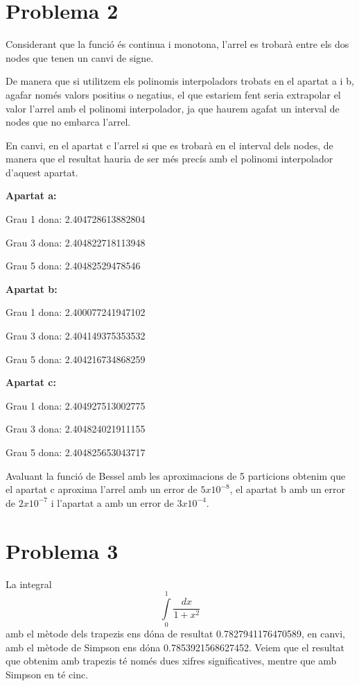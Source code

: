 \documentclass{article}
\begin{document}
	\section{Problema 2}
	
	Considerant que la funció és continua i monotona, l'arrel es trobarà entre els dos nodes que tenen un canvi de signe.
	
	De manera que si utilitzem els polinomis interpoladors trobats en el apartat a i b, agafar només valors positius o negatius, el que estariem fent seria extrapolar el valor l'arrel amb el polinomi interpolador, ja que haurem agafat un interval de nodes que no embarca l'arrel.
	
	En canvi, en el apartat c l'arrel si que es trobarà en el interval dels nodes, de manera que el resultat hauria de ser més precís amb el polinomi interpolador d'aquest apartat.
	
	\textbf{Apartat a:}
	
	Grau 1 dona: 2.404728613882804
	
	Grau 3 dona: 2.404822718113948
	
	Grau 5 dona: 2.40482529478546
	
	\textbf{Apartat b:}
	
	Grau 1 dona: 2.400077241947102
	
	Grau 3 dona: 2.404149375353532
	
	Grau 5 dona: 2.404216734868259
	
	\textbf{Apartat c:}
	
	Grau 1 dona: 2.404927513002775
	
	Grau 3 dona: 2.404824021911155
	
	Grau 5 dona: 2.404825653043717
	
	Avaluant la funció de Bessel amb les aproximacions de 5 particions obtenim que el apartat c aproxima l'arrel amb un error de $5x10^{-8}$, el apartat b amb un error de $2x10^{-7}$ i l'apartat a amb un error de $3x10^{-4}$.
	
	\newpage
	
	\section{Problema 3}
	La integral $$\int \limits_{0}^{1} \frac{dx}{1+x^2}$$ amb el mètode dels trapezis ens dóna de resultat 0.7827941176470589, en canvi, amb el mètode de Simpson ens dóna 0.7853921568627452. Veiem que el resultat que obtenim amb trapezis té només dues xifres significatives, mentre que amb Simpson en té cinc.
		
\end{document}
